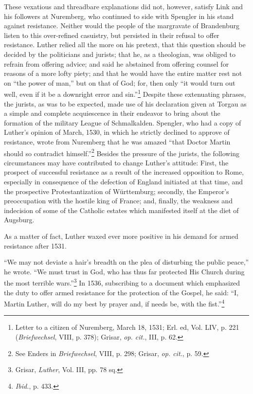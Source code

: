 These vexatious and threadbare explanations did not, however,
satisfy Link and his followers at Nuremberg, who continued to
side with Spengler in his stand against resistance. Neither would the
people of the margravate of Brandenburg listen to this over-refined
casuistry, but persisted in their refusal to offer resistance. Luther
relied all the more on his pretext, that this question should be decided
by the politicians and jurists; that he, as a theologian, was
obliged to refrain from offering advice; and said he abstained from
offering counsel for reasons of a more lofty piety; and that he would
have the entire matter rest not on “the power of man,” but on that
of God; for, then only “it would turn out well, even if it be a
downright error and sin.”\footnote
{Letter to a citizen of Nuremberg, March 18, 1531; Erl. ed, Vol. LIV, p. 221
(\textit{Briefwechsel}, VIII, p. 378); Grisar, \textit{op. cit.}, III, p. 62.}
Despite these extenuating phrases, the
jurists, as was to be expected, made use of his declaration given at
Torgau as a simple and complete acquiescence in their endeavor to
bring about the formation of the military League of Schmalkalden.
Spengler, who had a copy of Luther’s opinion of March, 1530, in
which he strictly declined to approve of resistance, wrote from
Nuremberg that he was amazed “that Doctor Martin should so
contradict himself.”\footnote
{See Enders in \textit{Briefwechsel}, VIII, p. 298; Grisar, \textit{op. cit.}, p. 59.}
 Besides the pressure of the jurists, the following
circumstances may have contributed to change Luther’s attitude: First,
the prospect of successful resistance as a result of the
increased opposition to Rome, especially in consequence of the defection
of England initiated at that time, and the prospective
Protestantization of Württemburg; secondly, the Emperor’s preoccupation
with the hostile king of France; and, finally, the weakness and
indecision of some of the Catholic estates which manifested itself at
the diet of Augsburg.

As a matter of fact, Luther waxed ever more positive in his demand
for armed resistance after 1531.

“We may not deviate a hair’s breadth on the plea of disturbing the
public peace,” he wrote. “We must trust in God, who has thus far
protected His Church during the most terrible wars.”\footnote
{Grisar, \textit{Luther}, Vol. III, pp. 78 sq.}
In 1536,
subscribing to a document which emphasized the duty to offer
armed resistance for the protection of the Gospel, he said: “I, Martin
Luther, will do my best by prayer and, if needs be, with the fist.”\footnote{\textit{Ibid.}, p. 433.}

